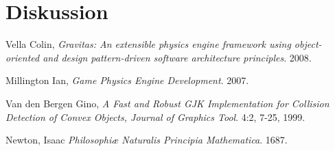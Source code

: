 \documentclass[a4paper,12pt,twopage,swedish]{article}
\begin{document}
\section{Diskussion}
\clearpage
\begin{thebibliography}{9}

  Vella Colin,
  \emph{Gravitas: An extensible physics engine framework using object-oriented and design pattern-driven software architecture principles}.
  2008.

  Millington Ian,
  \emph{Game Physics Engine Development}.
  2007.

  Van den Bergen Gino,
  \emph{A Fast and Robust GJK Implementation for Collision Detection of Convex Objects, Journal of Graphics Tool}.
  4:2, 7-25,
  1999.

  Newton, Isaac
  \emph{Philosophiæ Naturalis Principia Mathematica}.
  1687.

\end{thebibliography}
\end{document}
